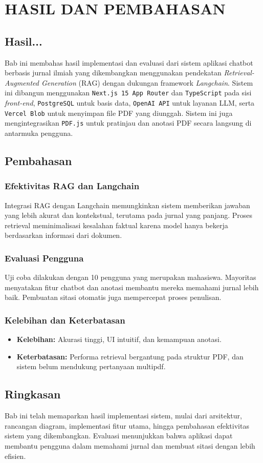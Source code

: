 \chapter{HASIL DAN PEMBAHASAN}

\section{Hasil...}
Bab ini membahas hasil implementasi dan evaluasi dari sistem aplikasi chatbot berbasis jurnal ilmiah yang dikembangkan menggunakan pendekatan \textit{Retrieval-Augmented Generation} (RAG) dengan dukungan framework \textit{Langchain}. Sistem ini dibangun menggunakan \texttt{Next.js 15 App Router} dan \texttt{TypeScript} pada sisi \textit{front-end}, \texttt{PostgreSQL} untuk basis data, \texttt{OpenAI API} untuk layanan LLM, serta \texttt{Vercel Blob} untuk menyimpan file PDF yang diunggah. Sistem ini juga mengintegrasikan \texttt{PDF.js} untuk pratinjau dan anotasi PDF secara langsung di antarmuka pengguna.

\section{Pembahasan}

\subsection{Efektivitas RAG dan Langchain}
Integrasi RAG dengan Langchain memungkinkan sistem memberikan jawaban yang lebih akurat dan kontekstual, terutama pada jurnal yang panjang. Proses retrieval meminimalisasi kesalahan faktual karena model hanya bekerja berdasarkan informasi dari dokumen.

\subsection{Evaluasi Pengguna}
Uji coba dilakukan dengan 10 pengguna yang merupakan mahasiswa. Mayoritas menyatakan fitur chatbot dan anotasi membantu mereka memahami jurnal lebih baik. Pembuatan sitasi otomatis juga mempercepat proses penulisan.

\subsection{Kelebihan dan Keterbatasan}
\begin{itemize}
  \item \textbf{Kelebihan:} Akurasi tinggi, UI intuitif, dan kemampuan anotasi.
  \item \textbf{Keterbatasan:} Performa retrieval bergantung pada struktur PDF, dan sistem belum mendukung pertanyaan multipdf.
\end{itemize}

\section{Ringkasan}
Bab ini telah memaparkan hasil implementasi sistem, mulai dari arsitektur, rancangan diagram, implementasi fitur utama, hingga pembahasan efektivitas sistem yang dikembangkan. Evaluasi menunjukkan bahwa aplikasi dapat membantu pengguna dalam memahami jurnal dan membuat sitasi dengan lebih efisien.